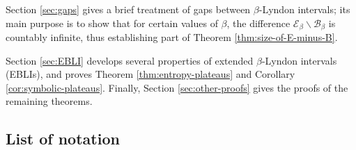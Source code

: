 \documentclass[11pt]{amsart}
\theoremstyle{definition}
\theoremstyle{remark}
\numberwithin{equation}{section}
\newcommand{\BB}{\mathscr{B}}
\newcommand{\EE}{\mathscr{E}}
\begin{document}
Section \ref{sec:gaps} gives a brief treatment of gaps between $\beta$-Lyndon intervals; its main purpose is to show that for certain values of $\beta$, the difference $\EE_\beta\backslash\BB_\beta$ is countably infinite, thus establishing part of Theorem \ref{thm:size-of-E-minus-B}.

Section \ref{sec:EBLI} develops several properties of extended $\beta$-Lyndon intervals (EBLIs), and proves Theorem \ref{thm:entropy-plateaus} and Corollary \ref{cor:symbolic-plateaus}. Finally, Section \ref{sec:other-proofs} gives the proofs of the remaining theorems.


\subsection{List of notation}
\end{document}
